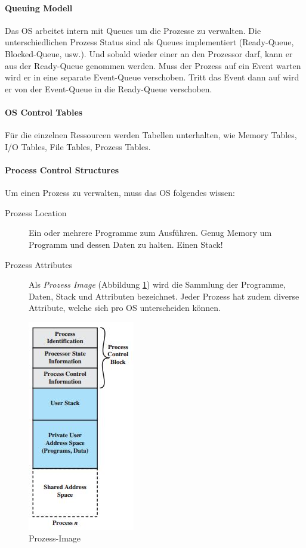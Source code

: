 \paragraph{Queuing Modell} Das OS arbeitet intern mit Queues um die Prozesse zu verwalten. Die unterschiedlichen Prozess Status sind als Queues implementiert (Ready-Queue, Blocked-Queue, usw.). Und sobald wieder einer an den Prozessor darf, kann er aus der Ready-Queue genommen werden. Muss der Prozess auf ein Event warten wird er in eine separate Event-Queue verschoben. Tritt das Event dann auf wird er von der Event-Queue in die Ready-Queue verschoben.

\paragraph{OS Control Tables} Für die einzelnen Ressourcen werden Tabellen unterhalten, wie Memory Tables, I/O Tables, File Tables, Prozess Tables.

\paragraph{Process Control Structures}
Um einen Prozess zu verwalten, muss das OS folgendes wissen:
\begin{description}
	\item[Prozess Location] Ein oder mehrere Programme zum Ausführen. Genug Memory um Programm und dessen Daten zu halten. Einen Stack!
	\item[Prozess Attributes] Als \emph{Prozess Image} (Abbildung \ref{fig:system-software-prozess-image}) wird die Sammlung der Programme, Daten, Stack und Attributen bezeichnet. Jeder Prozess hat zudem diverse Attribute, welche sich pro OS unterscheiden können.
\end{description}

\begin{figure}[h!]
\centering
\includegraphics[width=0.2\linewidth]{fig/system-software-prozess-image}
\caption{Prozess-Image}
\label{fig:system-software-prozess-image}
\end{figure}


